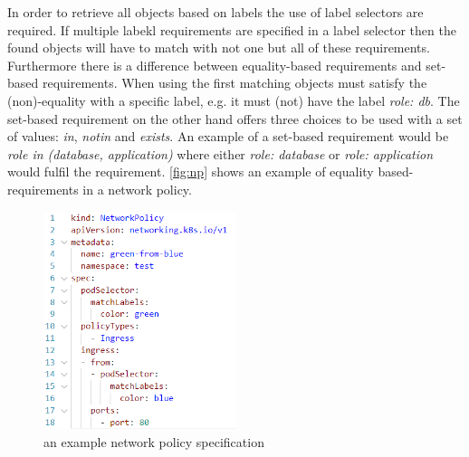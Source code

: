 In order to retrieve all objects based on labels the use of label selectors are required.  If multiple labekl requirements are specified in a label selector then the found objects will have to match with not one but all of these requirements. Furthermore there is a difference between equality-based requirements and set-based requirements. When using the first matching objects must satisfy the (non)-equality with a specific label, e.g. it must (not) have the label \textit{role: db}. The set-based requirement on the other hand offers three choices to be used with a set of values: \textit{in}, \textit{notin} and \textit{exists}. An example of a set-based requirement would be \textit{role in (database, application)} where either \textit{role: database} or \textit{role: application} would fulfil the requirement. \autoref{fig:np} shows an example of equality based-requirements in a network policy. \cite{labels}
\\[10pt]

\begin{figure}[htbp]
  \centering
  \includegraphics[width=0.5\textwidth]{images/np.png} 
  \caption{an example network policy specification}
  \label{fig:np}
\end{figure}


